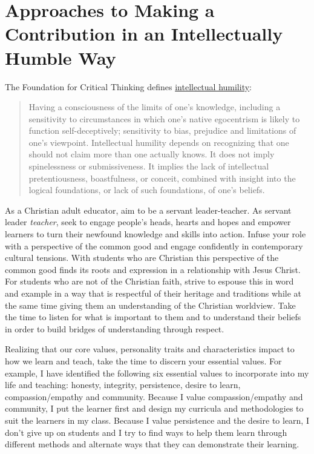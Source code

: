 \documentclass[
]{book}
\begin{document}
\hypertarget{approaches-to-making-a-contribution-in-an-intellectually-humble-way}{%
\section{Approaches to Making a Contribution in an Intellectually Humble Way}\label{approaches-to-making-a-contribution-in-an-intellectually-humble-way}}

The Foundation for Critical Thinking defines \href{http://www.criticalthinking.org/pages/valuable-intellectual-traits/528}{intellectual humility}:

\begin{quote}
Having a consciousness of the limits of one's knowledge, including a sensitivity to circumstances in which one's native egocentrism is likely to function self-deceptively; sensitivity to bias, prejudice and limitations of one's viewpoint. Intellectual humility depends on recognizing that one should not claim more than one actually knows. It does not imply spinelessness or submissiveness. It implies the lack of intellectual pretentiousness, boastfulness, or conceit, combined with insight into the logical foundations, or lack of such foundations, of one's beliefs.~
\end{quote}

As a Christian adult educator, aim to be a servant leader-teacher. As servant leader \emph{teacher}, seek to engage people's heads, hearts and hopes and empower learners to turn their newfound knowledge and skills into action. Infuse your role with a perspective of the common good and engage confidently in contemporary cultural tensions. With students who are Christian this perspective of the common good finds its roots and expression in a relationship with Jesus Christ. For students who are not of the Christian faith, strive to espouse this in word and example in a way that is respectful of their heritage and traditions while at the same time giving them an understanding of the Christian worldview. Take the time to listen for what is important to them and to understand their beliefs in order to build bridges of understanding through respect.

Realizing that our core values, personality traits and characteristics impact to how we learn and teach, take the time to discern your essential values. For example, I have identified the following six essential values to incorporate into my life and teaching: honesty, integrity, persistence, desire to learn, compassion/empathy and community. Because I value compassion/empathy and community, I put the learner first and design my curricula and methodologies to suit the learners in my class. Because I value persistence and the desire to learn, I don't give up on students and I try to find ways to help them learn through different methods and alternate ways that they can demonstrate their learning.
\end{document}
